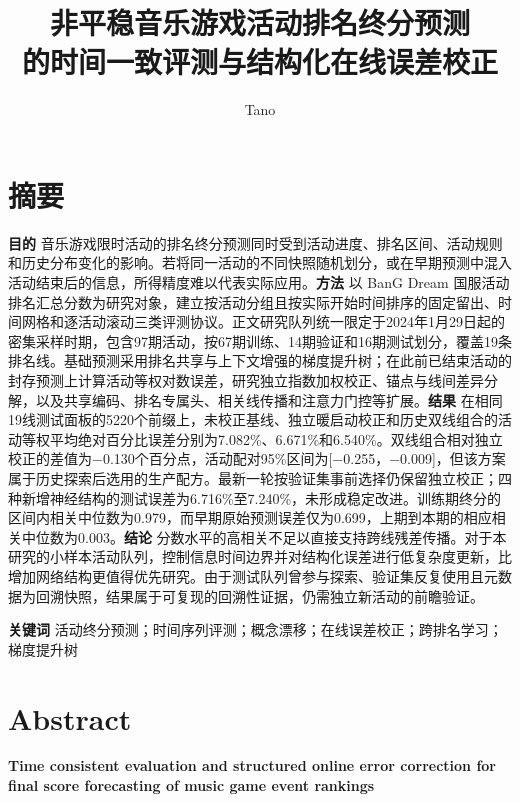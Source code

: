 \documentclass[a4paper,11pt,fontset=none]{ctexart}
\title{非平稳音乐游戏活动排名终分预测\\的时间一致评测与结构化在线误差校正}
\author{Tano}\date{}
\makeatletter
\renewcommand{\maketitle}{\begin{center}{\fontsize{16}{22}\selectfont\bfseries\@title\par}\vspace{0.6em}{\normalsize\@author\par}\end{center}\vspace{0.5em}}
\makeatother
\begin{document}
\maketitle

\section*{摘要}

\textbf{目的} 音乐游戏限时活动的排名终分预测同时受到活动进度、排名区间、活动规则和历史分布变化的影响。若将同一活动的不同快照随机划分，或在早期预测中混入活动结束后的信息，所得精度难以代表实际应用。\textbf{方法} 以 BanG Dream 国服活动排名汇总分数为研究对象，建立按活动分组且按实际开始时间排序的固定留出、时间网格和逐活动滚动三类评测协议。正文研究队列统一限定于2024年1月29日起的密集采样时期，包含97期活动，按67期训练、14期验证和16期测试划分，覆盖19条排名线。基础预测采用排名共享与上下文增强的梯度提升树；在此前已结束活动的封存预测上计算活动等权对数误差，研究独立指数加权校正、锚点与线间差异分解，以及共享编码、排名专属头、相关线传播和注意力门控等扩展。\textbf{结果} 在相同19线测试面板的5220个前缀上，未校正基线、独立暖启动校正和历史双线组合的活动等权平均绝对百分比误差分别为7.082\%、6.671\%和6.540\%。双线组合相对独立校正的差值为−0.130个百分点，活动配对95\%区间为{[}−0.255，−0.009{]}，但该方案属于历史探索后选用的生产配方。最新一轮按验证集事前选择仍保留独立校正；四种新增神经结构的测试误差为6.716\%至7.240\%，未形成稳定改进。训练期终分的区间内相关中位数为0.979，而早期原始预测误差仅为0.699，上期到本期的相应相关中位数为0.003。\textbf{结论} 分数水平的高相关不足以直接支持跨线残差传播。对于本研究的小样本活动队列，控制信息时间边界并对结构化误差进行低复杂度更新，比增加网络结构更值得优先研究。由于测试队列曾参与探索、验证集反复使用且元数据为回溯快照，结果属于可复现的回溯性证据，仍需独立新活动的前瞻验证。

\textbf{关键词} 活动终分预测；时间序列评测；概念漂移；在线误差校正；跨排名学习；梯度提升树

\clearpage

\section*{Abstract}

\textbf{Time consistent evaluation and structured online error correction for final score forecasting of music game event rankings}
\end{document}
